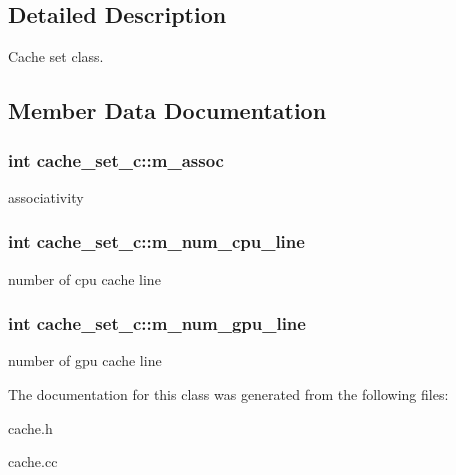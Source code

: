 \subsection{Detailed Description}
Cache set class. 

\subsection{Member Data Documentation}
\hypertarget{classcache__set__c_ab8db54aedcbd7fb124d92232c08a07b2}{
\subsubsection[{m\_\-assoc}]{\setlength{\rightskip}{0pt plus 5cm}int {\bf cache\_\-set\_\-c::m\_\-assoc}}}
\label{classcache__set__c_ab8db54aedcbd7fb124d92232c08a07b2}
associativity \hypertarget{classcache__set__c_aeb0bbed9523176f9a3a7a7c73f6a8592}{
\subsubsection[{m\_\-num\_\-cpu\_\-line}]{\setlength{\rightskip}{0pt plus 5cm}int {\bf cache\_\-set\_\-c::m\_\-num\_\-cpu\_\-line}}}
\label{classcache__set__c_aeb0bbed9523176f9a3a7a7c73f6a8592}
number of cpu cache line \hypertarget{classcache__set__c_aab7f653ba80c1a5f4c5cd35b9d816857}{
\subsubsection[{m\_\-num\_\-gpu\_\-line}]{\setlength{\rightskip}{0pt plus 5cm}int {\bf cache\_\-set\_\-c::m\_\-num\_\-gpu\_\-line}}}
\label{classcache__set__c_aab7f653ba80c1a5f4c5cd35b9d816857}
number of gpu cache line 

The documentation for this class was generated from the following files:\begin{DoxyCompactItemize}
\item 
cache.h\item 
cache.cc\end{DoxyCompactItemize}
